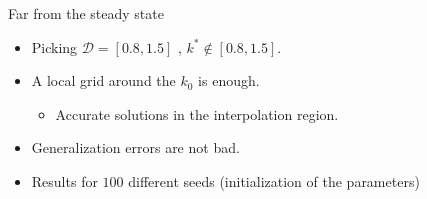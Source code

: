 \documentclass[aspectratio=169,10pt]{beamer}
\begin{document}
\begin{frame}{Far from the steady state}
	\begin{minipage}[t]{0.4\textwidth}
	\end{minipage}
	\hfill%
	\begin{minipage}[t]{0.5\textwidth}\raggedleft
		\begin{itemize}
			\item Picking $\mathcal{D}= [0.8,1.5]$ , $k^*\notin [0.8,1.5]$.
			\smallskip 
			\item A local grid around the $k_0$ is enough.   
			\begin{itemize}
				\item Accurate solutions in the interpolation region.
			\end{itemize}
			\smallskip 
			\item Generalization errors are not bad.
			\smallskip
			\item Results for $100$ different seeds (initialization of the parameters)
		\end{itemize}
	\end{minipage} 
\end{frame}
\end{document}
